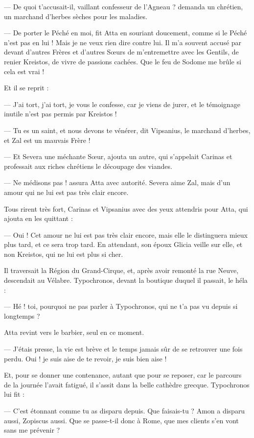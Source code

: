 \documentclass[a4paper, 11pt, oneside, polutonikogreek, french]{article}
\begin{document}
--- De quoi t'accusait-il, vaillant confesseur de l’Agneau ? demanda un chrétien, un marchand d'herbes sèches pour les maladies.

--- De porter le Péché en moi, fit Atta en souriant doucement, comme si le Péché n'est pas en lui ! Mais je ne veux rien dire contre lui. Il m'a souvent accusé par devant d'autres Frères et d'autres Sœurs de m'entremettre avec les Gentils, de renier Kreistos, de vivre de passions cachées. Que le feu de Sodome me brûle si cela est vrai !

Et il se reprit :

--- J'ai tort, j'ai tort, je vous le confesse, car je viens de jurer, et le témoignage inutile n'est pas permis par Kreistos !

--- Tu es un saint, et nous devons te vénérer, dit Vipsanius, le marchand d'herbes, et Zal est un mauvais Frère !

--- Et Severa une méchante Sœur, ajouta un autre, qui s'appelait Carinas et professait aux riches chrétiens le découpage des viandes.

--- Ne médisons pas ! assura Atta avec autorité. Severa aime Zal, mais d'un amour qui ne lui est pas très clair encore.

Tous rirent très fort, Carinas et Vipsanius avec des yeux attendris pour Atta, qui ajouta en les quittant :

--- Oui ! Cet amour ne lui est pas très clair encore, mais elle le distinguera mieux plus tard, et ce sera trop tard. En attendant, son époux Glicia veille sur elle, et non Kreistos, qui ne lui est plus si cher.

Il traversait la Région du Grand-Cirque, et, après avoir remonté la rue Neuve, descendait au Vélabre. Typochronos, devant la boutique duquel il passait, le héla :

--- Hé ! toi, pourquoi ne pas parler à Typochronos, qui ne t'a pas vu depuis si longtemps ?

Atta revint vers le barbier, seul en ce moment.

--- J'étais presse, la vie est brève et le temps jamais sûr de se retrouver une fois perdu. Oui ! je suis aise de te revoir, je suis bien aise !

Et, pour se donner une contenance, autant que pour se reposer, car le parcours de la journée l'avait fatigué, il s'assit dans la belle cathèdre grecque. Typochronos lui fit :

--- C'est étonnant comme tu as disparu depuis. Que faisais-tu ? Amon a disparu aussi, Zopiscus aussi. Que se passe-t-il donc à Rome, que mes clients s'en vont sans me prévenir ?
\end{document}
